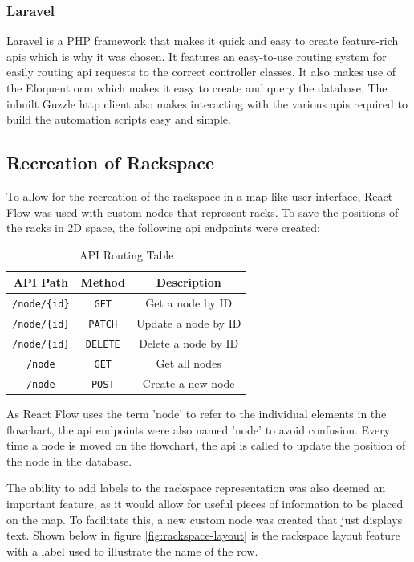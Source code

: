 \subsubsection{Laravel}
Laravel is a PHP framework that makes it quick and easy to create feature-rich \gls{api}s which is why it was chosen. It features an easy-to-use routing system for easily routing \gls{api} requests to the correct controller classes. It also makes use of the Eloquent \gls{orm} which makes it easy to create and query the database. The inbuilt Guzzle \gls{http} client also makes interacting with the various \gls{api}s required to build the automation scripts easy and simple.

\subsection{Recreation of Rackspace}
To allow for the recreation of the rackspace in a map-like user interface, React Flow was used with custom nodes that represent racks. To save the positions of the racks in 2D space, the following \gls{api} endpoints were created:
\begin{table}[htbp]
    \centering
    \begin{tabular}{@{} c c c @{}}
        \toprule
        \textbf{API Path}     & \textbf{Method} & \textbf{Description} \\
        \midrule
        \texttt{/node/\{id\}} & \texttt{GET}    & Get a node by ID     \\
        \texttt{/node/\{id\}} & \texttt{PATCH}  & Update a node by ID  \\
        \texttt{/node/\{id\}} & \texttt{DELETE} & Delete a node by ID  \\
        \texttt{/node}        & \texttt{GET}    & Get all nodes        \\
        \texttt{/node}        & \texttt{POST}   & Create a new node    \\
        \bottomrule
    \end{tabular}
    \caption{API Routing Table}
\end{table}
As React Flow uses the term 'node' to refer to the individual elements in the flowchart, the \gls{api} endpoints were also named 'node' to avoid confusion. Every time a node is moved on the flowchart, the \gls{api} is called to update the position of the node in the database. 

The ability to add labels to the rackspace representation was also deemed an important feature, as it would allow for useful pieces of information to be placed on the map. To facilitate this, a new custom node was created that just displays text. Shown below in figure \ref{fig:rackspace-layout} is the rackspace layout feature with a label used to illustrate the name of the row.

